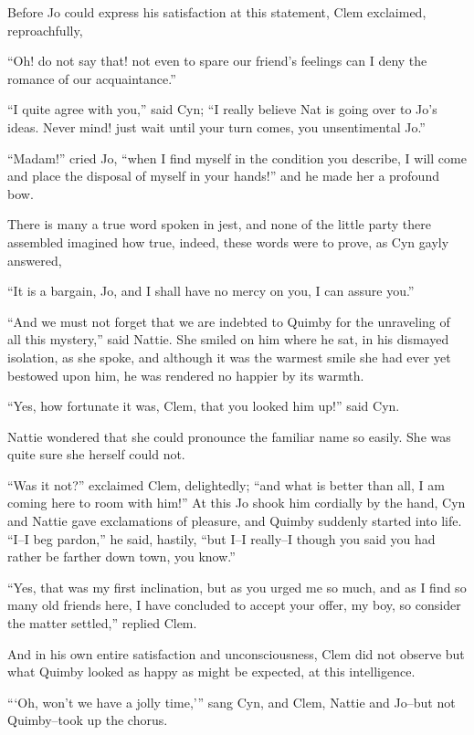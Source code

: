 Before Jo could express his satisfaction at this statement, Clem
exclaimed, reproachfully,

``Oh! do not say that! not even to spare our friend's feelings can I deny
the romance of our acquaintance.''

``I quite agree with you,'' said Cyn; ``I really believe Nat is going over
to Jo's ideas. Never mind! just wait until your turn comes, you
unsentimental Jo.''

``Madam!'' cried Jo, ``when I find myself in the condition you describe, I
will come and place the disposal of myself in your hands!'' and he made
her a profound bow.

There is many a true word spoken in jest, and none of the little party
there assembled imagined how true, indeed, these words were to prove, as
Cyn gayly answered,

``It is a bargain, Jo, and I shall have no mercy on you, I can assure
you.''

``And we must not forget that we are indebted to Quimby for the
unraveling of all this mystery,'' said Nattie. She smiled on him where he
sat, in his dismayed isolation, as she spoke, and although it was the
warmest smile she had ever yet bestowed upon him, he was rendered no
happier by its warmth.

``Yes, how fortunate it was, Clem, that you looked him up!'' said Cyn.

Nattie wondered that she could pronounce the familiar name so easily.
She was quite sure she herself could not.

``Was it not?'' exclaimed Clem, delightedly; ``and what is better than all,
I am coming here to room with him!'' At this Jo shook him cordially by
the hand, Cyn and Nattie gave exclamations of pleasure, and Quimby
suddenly started into life. ``I--I beg pardon,'' he said, hastily, ``but
I--I really--I though you said you had rather be farther down town, you
know.''

``Yes, that was my first inclination, but as you urged me so much, and as
I find so many old friends here, I have concluded to accept your offer,
my boy, so consider the matter settled,'' replied Clem.

And in his own entire satisfaction and unconsciousness, Clem did not
observe but what Quimby looked as happy as might be expected, at this
intelligence.

``{}`Oh, won't we have a jolly time,'{}'' sang Cyn, and Clem, Nattie and
Jo--but not Quimby--took up the chorus.

